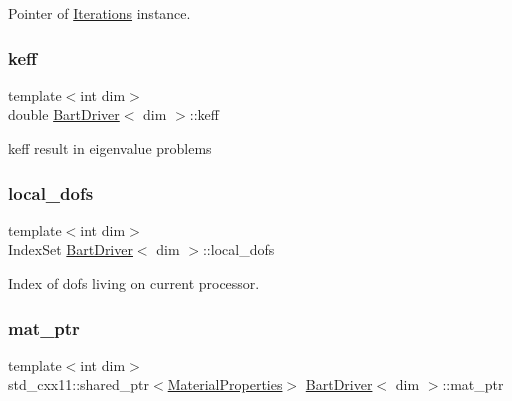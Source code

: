 Pointer of \hyperlink{class_iterations}{Iterations} instance. 

\mbox{\label{class_bart_driver_a459fab858171aa05e4618d6d9d327e87}} 
\subsubsection{\texorpdfstring{keff}{keff}}
{\footnotesize\ttfamily template$<$int dim$>$ \\
double \hyperlink{class_bart_driver}{Bart\+Driver}$<$ dim $>$\+::keff\hspace{0.3cm}{\ttfamily [private]}}



keff result in eigenvalue problems 

\mbox{\label{class_bart_driver_a06a4f83c6f9bea928ec311fcdf974ab1}} 
\subsubsection{\texorpdfstring{local\+\_\+dofs}{local\_dofs}}
{\footnotesize\ttfamily template$<$int dim$>$ \\
Index\+Set \hyperlink{class_bart_driver}{Bart\+Driver}$<$ dim $>$\+::local\+\_\+dofs\hspace{0.3cm}{\ttfamily [private]}}



Index of dofs living on current processor. 

\mbox{\label{class_bart_driver_aef9abac579c212463a6790a0e39e6429}} 
\subsubsection{\texorpdfstring{mat\+\_\+ptr}{mat\_ptr}}
{\footnotesize\ttfamily template$<$int dim$>$ \\
std\+\_\+cxx11\+::shared\+\_\+ptr$<$\hyperlink{class_material_properties}{Material\+Properties}$>$ \hyperlink{class_bart_driver}{Bart\+Driver}$<$ dim $>$\+::mat\+\_\+ptr\hspace{0.3cm}{\ttfamily [private]}}



